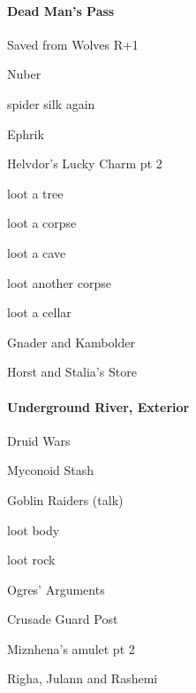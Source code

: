 \documentclass[10pt,a4,twoside]{book}
\begin{document}
\begin{multicols}{3}
\paragraph*{Dead Man's Pass}
\begin{trivlist}
\item Saved from Wolves \textcolor{OliveGreen}{R+1}
\item Nuber
\item spider silk again
\item Ephrik
\item Helvdor's Lucky Charm pt 2 %
\item loot a tree
\item loot a corpse
\item loot a cave
\item loot another corpse
\item loot a cellar
\item Gnader and Kambolder
\item Horst and Stalia's Store
\end{trivlist}


\paragraph*{Underground River, Exterior}
\begin{trivlist}
\item Druid Wars
\item Myconoid Stash
\item Goblin Raiders (talk)
\item loot body
\item loot rock
\item Ogres' Arguments
\item Crusade Guard Post
\item Miznhena's amulet pt 2 %
\item Righa, Julann and Rashemi %
\end{trivlist}


\end{multicols}
\end{document}
